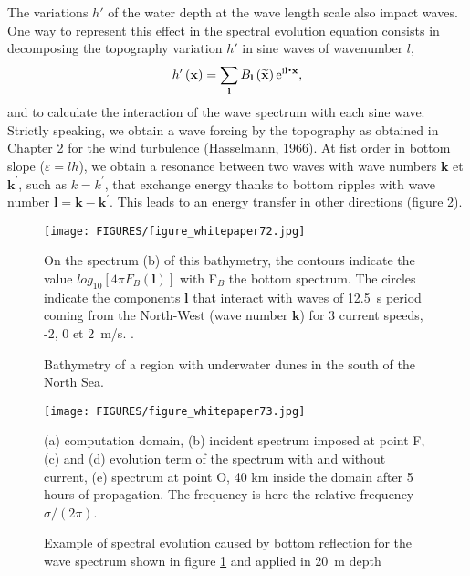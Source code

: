 The variations $h'$ of the water depth at the wave length scale also impact waves.
One way to represent this effect in the spectral evolution equation consists in
decomposing the topography variation $h'$ in sine waves of wavenumber $l$,
\begin{equation}
h'\left({\mathbf x}\right) =\sum_{{\mathbf l}}
B_{{\mathbf l}}\left( \widetilde{\mathbf x}\right)
\mathrm{e}^{\mathrm{i}{\mathbf l}\mbox{\boldmath $\cdot$}{\mathbf x}},  \label{h}
\end{equation}
and to calculate the interaction of the wave spectrum with each sine wave.
Strictly speaking, we obtain a wave forcing by the topography as obtained
in Chapter 2 for the wind turbulence (Hasselmann, 1966\nocite{Hasselmann1966}).
At fist order in bottom slope ($\varepsilon = lh$), we obtain a resonance between
two waves with wave numbers ${\mathbf k}$ et ${\mathbf k}^{\prime }$, such as
$k=k^\prime$, that exchange energy thanks to bottom ripples with wave number
${\mathbf l}={\mathbf k}-{\mathbf k}^{\prime}$. This leads to an energy transfer
in other directions (figure \ref{fig:Braggscattering2}).


\begin{figure}[htb]
\centerline{\texttt{[image: FIGURES/figure\_whitepaper72.jpg]}}
  \caption{Bathymetry of a region with underwater dunes in the south of the North Sea.}{On the
  spectrum (b) of this bathymetry, the contours indicate the value  $log_{10}[4\pi F_B({\mathbf l})]$
  with F$_B$ the bottom spectrum. The circles indicate the components ${\mathbf l}$ that interact
  with waves of 12.5~s period coming from the North-West (wave number ${\mathbf k}$) for 3 current
  speeds, -2, 0 et 2~m/s. .}\label{fig:Braggscattering1}
\end{figure}

\begin{figure}[htb]
\centerline{\texttt{[image: FIGURES/figure\_whitepaper73.jpg]}}
  \caption{Example of spectral evolution caused by bottom reflection for the wave spectrum shown in 
  figure \ref{fig:Braggscattering1} and applied in 20~m depth }{(a) computation domain, (b) incident spectrum imposed at point F,
  (c) and (d) evolution term of the spectrum with and without current, (e) spectrum at point O, 40 km inside the domain after
  5 hours of propagation. The frequency is here the relative frequency $\sigma/(2 \pi)$.}\label{fig:Braggscattering2}
\end{figure}

